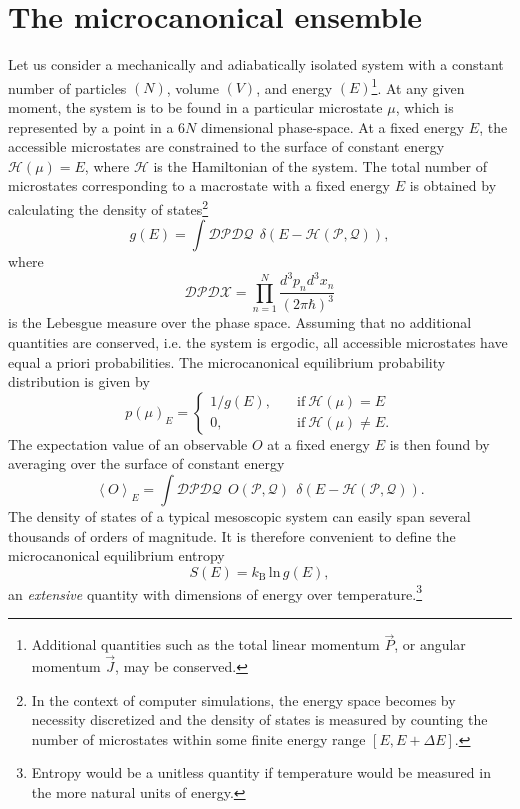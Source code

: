 \documentclass[12pt]{report}
\begin{document}
\section{The microcanonical ensemble}
Let us consider a mechanically and adiabatically isolated system with a constant number of particles $(N)$, volume $(V)$, and energy $(E)$\footnote{Additional quantities such as the total linear momentum $\vec{P}$, or angular momentum $\vec{J}$, may be conserved.}. At any given moment, the system is to be found in a particular microstate $\mu$, which is represented by a point in a $6N$ dimensional phase-space. At a fixed energy $E$, the accessible microstates are constrained to the surface of constant energy $\mathcal{H}(\mu) = E$, where $\mathcal{H}$ is the Hamiltonian of the system. The total number of microstates corresponding to a macrostate with a fixed energy $E$ is obtained by calculating the density of states\footnote{In the context of computer simulations, the energy space becomes by necessity discretized and the density of states is measured by counting the number of microstates within some finite energy range $[E,E+\Delta E]$.}
\begin{equation}
g(E) = \int \mathcal{DP}\mathcal{DQ} \:\: \delta(E - \mathcal{H}(\mathcal{P},\mathcal{Q})),
\end{equation} 
where 
\begin{equation}
\mathcal{DP}\mathcal{DX} = \prod_{n = 1}^{N} \frac{d^{3}p_{n}d^{3}x_{n}}{(2 \pi \hbar)^{3}}
\end{equation}
is the Lebesgue measure over the phase space.
Assuming that no additional quantities are conserved, i.e. the system is ergodic, all accessible microstates have equal a priori probabilities. The microcanonical equilibrium probability distribution is given by 
\begin{equation}
p(\mu)_{E} = \left\{
\begin{array}{lr}
1/g(E), & \quad
\mathrm{if} \: \mathcal{H(\mu)} = E\\
0, & \quad \mathrm{if} \: \mathcal{H(\mu)} \neq E.
\end{array}
\right.
\end{equation}
The expectation value of an observable $O$ at a fixed energy $E$ is then found by averaging over the surface of constant energy
\begin{equation}
\left< O \right>_{E} = \int \mathcal{DP}\mathcal{DQ} \:\: O(\mathcal{P},\mathcal{Q}) \:\: \delta(E - \mathcal{H}(\mathcal{P},\mathcal{Q})).
\end{equation}
The density of states of a typical mesoscopic system can easily span several thousands of orders of magnitude. It is therefore convenient to define the microcanonical equilibrium entropy
\begin{equation}
S(E) = k_\mathrm{B}\, \mathrm{ln}\, g(E),
\end{equation}
an \textit{extensive} quantity with dimensions of energy over temperature.\footnote{Entropy would be a unitless quantity if temperature would be measured in the more natural units of energy.}
\end{document}
